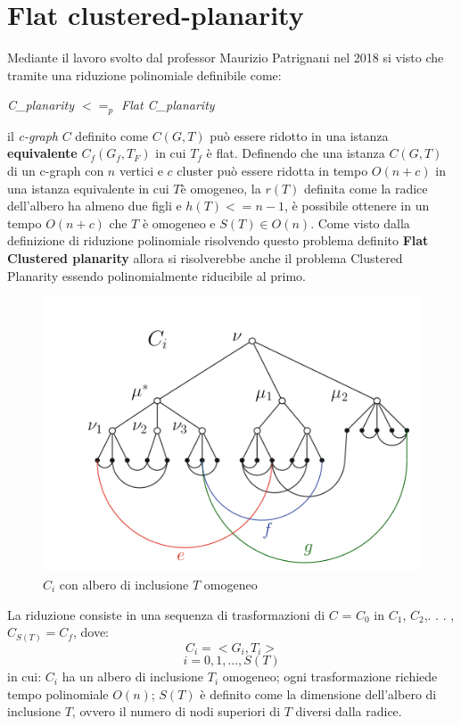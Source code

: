 {\section{Flat clustered-planarity}
Mediante il lavoro svolto dal professor Maurizio Patrignani nel 2018 si visto che tramite una riduzione polinomiale definibile come:
\begin{center}
	\textit{C\_planarity $<=_p$ Flat C\_planarity}
\end{center} 
 il \textit{c-graph} $C$ definito come $C(G,T)$  può essere ridotto in una istanza \textbf{equivalente} $C_f(G_f,T_F)$ in cui $T_f$ è flat.
Definendo che una istanza $C(G,T)$ di un c-graph con $n$ vertici e $c$ cluster può essere ridotta in tempo $O(n+c)$ in una istanza equivalente in cui $T$è omogeneo, la $r(T)$ definita come la radice dell'albero ha almeno due figli e $h(T)<=n-1$,
è possibile ottenere in un tempo $O(n+c)$ che $T$ è omogeneo e $S(T)\in O(n)$.
Come visto dalla definizione di riduzione polinomiale risolvendo questo problema definito \textbf{Flat Clustered planarity} allora si risolverebbe anche il problema Clustered Planarity essendo polinomialmente riducibile al primo.
\newpage
\begin{figure}[!htb]
	\begin{center}
		\includegraphics[width=0.8 \linewidth]{figure/preFlat}
	\end{center}
	\caption{$C_i$ con albero di inclusione $T$ omogeneo \label{fig:preFlat}}
\end{figure} 
La riduzione consiste in una sequenza di trasformazioni di $C$ = $C_0$ in $C_1$, $C_2$,. . . , $C_{S(T)} = C_f$, dove:
$$C_i = <G_i, T_i>$$
$$i = 0, 1,. . . , S(T)$$
in cui: $C_i$ ha un albero di inclusione $T_i$ omogeneo; ogni trasformazione richiede tempo polinomiale $O(n)$; $S(T)$ è definito come la dimensione dell'albero di inclusione $T$, ovvero il numero di nodi superiori di $T$ diversi dalla radice.\\
}
